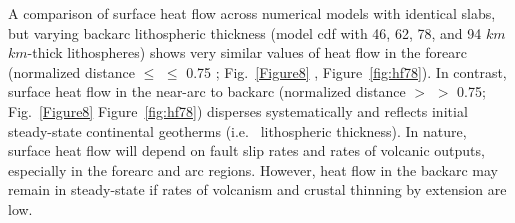 \documentclass[draft,linenumbers]{agujournal2018} %
\providecommand{\DIFaddtex}[1]{{\protect\color{blue} \sf #1}} %
\providecommand{\DIFdeltex}[1]{{\protect\color{red} \scriptsize #1}} %
\providecommand{\DIFaddbegin}{} %
\providecommand{\DIFaddend}{} %
\providecommand{\DIFdelbegin}{} %
\providecommand{\DIFdelend}{} %
\providecommand{\DIFadd}[1]{\texorpdfstring{\DIFaddtex{#1}}{#1}} %
\providecommand{\DIFdel}[1]{\texorpdfstring{\DIFdeltex{#1}}{}} %
\newcommand{\DIFscaledelfig}{0.3}
\newlength{\DIFdelgraphicswidth} %
\newlength{\DIFdelgraphicsheight} %
\newcommand{\DIFaddincludegraphics}[2][]{{\color{blue}\fbox{\DIFOincludegraphics[#1]{#2}}}} %
\newcommand{\DIFdelincludegraphics}[2][]{%
\sbox{\DIFdelgraphicsbox}{\DIFOincludegraphics[#1]{#2}}%
\settoboxwidth{\DIFdelgraphicswidth}{\DIFdelgraphicsbox} %
\settoboxtotalheight{\DIFdelgraphicsheight}{\DIFdelgraphicsbox} %
\scalebox{\DIFscaledelfig}{%
\parbox[b]{\DIFdelgraphicswidth}{\usebox{\DIFdelgraphicsbox}\\[-\baselineskip] \rule{\DIFdelgraphicswidth}{0em}}\llap{\resizebox{\DIFdelgraphicswidth}{\DIFdelgraphicsheight}{%
\setlength{\unitlength}{\DIFdelgraphicswidth}%
\begin{picture}(1,1)%
\thicklines\linethickness{2pt} %
{\color[rgb]{1,0,0}\put(0,0){\framebox(1,1){}}}%
{\color[rgb]{1,0,0}\put(0,0){\line( 1,1){1}}}%
{\color[rgb]{1,0,0}\put(0,1){\line(1,-1){1}}}%
\end{picture}%
}\hspace*{3pt}}} %
} %
\DeclareRobustCommand{\DIFaddbegin}{\DIFOaddbegin \let\includegraphics\DIFaddincludegraphics} %
\DeclareRobustCommand{\DIFaddend}{\DIFOaddend \let\includegraphics\DIFOincludegraphics} %
\DeclareRobustCommand{\DIFdelbegin}{\DIFOdelbegin \let\includegraphics\DIFdelincludegraphics} %
\DeclareRobustCommand{\DIFdelend}{\DIFOaddend \let\includegraphics\DIFOincludegraphics} %
\begin{document}
\DIFdelend A comparison of surface heat flow across numerical models with identical
slabs, but varying backarc lithospheric thickness (model cdf with 46,
62, 78, and 94 \DIFdelbegin \DIFdel{$km$}\DIFdelend \DIFaddbegin \DIFadd{\(km\)}\DIFaddend -thick lithospheres) shows very similar values of
heat flow in the forearc (normalized distance \DIFdelbegin \DIFdel{$\leq$ }\DIFdelend \DIFaddbegin \DIFadd{\(\leq\) }\DIFaddend 0.75\DIFdelbegin \DIFdel{; Fig.~\ref{Figure8}}\DIFdelend \DIFaddbegin \DIFadd{,
Figure~\ref{fig:hf78}}\DIFaddend ). In contrast, surface heat flow in the near-arc
to backarc (normalized distance \DIFdelbegin \DIFdel{$>$ }\DIFdelend \DIFaddbegin \DIFadd{\(>\) }\DIFaddend 0.75; \DIFdelbegin \DIFdel{Fig.~\ref{Figure8}}\DIFdelend \DIFaddbegin \DIFadd{Figure~\ref{fig:hf78}}\DIFaddend )
disperses systematically and reflects initial steady-state continental
geotherms (i.e.\DIFaddbegin \DIFadd{~}\DIFaddend lithospheric thickness). \DIFaddbegin \DIFadd{In nature, surface heat flow
will depend on fault slip rates and rates of volcanic outputs,
especially in the forearc and arc regions. However, heat flow in the
backarc may remain in steady-state if rates of volcanism and crustal
thinning by extension are low.
}\DIFaddend
\end{document}
